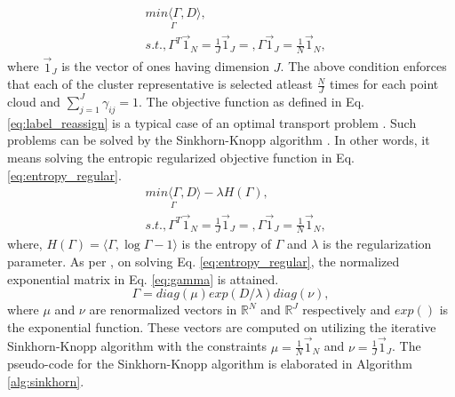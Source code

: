 \begin{equation}
    \label{eq:label_reassign}
    \begin{split}
        &\underset{\Gamma}{min \langle \Gamma, D \rangle},\\
        &s.t., \Gamma^{T}\vec{1}_{\mathit{N}} = \frac{1}{\mathit{J}}\vec{1}_{J} =, \Gamma\vec{1}_{J} = \frac{1}{\mathit{N}}\vec{1}_{\mathit{N}},
    \end{split}    
\end{equation}
where $\vec{1}_{J}$ is the vector of ones having dimension $J$. The above condition enforces that each of the cluster representative is  selected atleast $\frac{N}{J}$ times for each point cloud and $\sum_{j=1}^{J}\gamma_{ij}=1$. The objective function as defined in Eq.\ref{eq:label_reassign} is a typical case of an optimal transport problem \cite{peyre2019computational}. Such problems can be solved by the Sinkhorn-Knopp algorithm \cite{cuturi2013sinkhorn}. In other words, it means solving the entropic regularized objective function in Eq. \ref{eq:entropy_regular}.
\begin{equation}
    \label{eq:entropy_regular}
    \begin{split}
        &\underset{\Gamma}{min \langle \Gamma, D \rangle} - \lambda \mathit{H}(\Gamma),\\
        &s.t., \Gamma^{T}\vec{1}_{\mathit{N}} = \frac{1}{\mathit{J}}\vec{1}_{J} =, \Gamma\vec{1}_{J} = \frac{1}{\mathit{N}}\vec{1}_{\mathit{N}},
    \end{split}    
\end{equation}
where, $\mathit{H}(\Gamma) = \langle \Gamma, \log \Gamma -1 \rangle $ is the entropy of $\Gamma$ and $\lambda$ is the regularization parameter. As per \cite{cuturi2013sinkhorn}, on solving Eq. \ref{eq:entropy_regular}, the normalized exponential matrix in Eq. \ref{eq:gamma} is attained. 
\begin{equation}
    \label{eq:gamma}
    \Gamma = diag(\mu) exp(\mathit{D/\lambda}) diag(\nu),
\end{equation}
where $\mu$ and $\nu$ are renormalized vectors in $\mathbb{R}^N$ and $\mathbb{R}^J$ respectively and $exp()$ is the exponential function. These vectors are computed on utilizing the iterative Sinkhorn-Knopp algorithm\cite{cuturi2013sinkhorn} with the constraints $ \mu = \frac{1}{\mathit{N}} \vec{1}_{\mathit{N}} $ and $ \nu = \frac{1}{\mathit{J}} \vec{1}_{\mathit{J}} $. The pseudo-code for the Sinkhorn-Knopp algorithm is elaborated in Algorithm \ref{alg:sinkhorn}.

